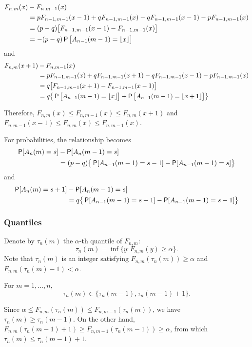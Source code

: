 \documentclass[11pt,draft]{article}
\begin{document}
\begin{align*}
 F_{n,m}(x) &- F_{n,m-1}(x) \\
&= p F_{n-1,m-1}(x-1) + q F_{n-1,m-1}(x) - q F_{n-1,m-1}(x-1)
 - p F_{n-1,m-1}(x) \\
&= (p-q) \big[ F_{n-1,m-1}(x-1) - F_{n-1,m-1}(x) \big] \\
&= -(p-q) \P\big[A_{n-1}(m-1) = \lfloor x \rfloor\big]
\end{align*}
and
\begin{align*}
 F_{n,m}(x+1) &- F_{n,m-1}(x) \\
&= p F_{n-1,m-1}(x) + q F_{n-1,m-1}(x+1) - q F_{n-1,m-1}(x-1)
 - p F_{n-1,m-1}(x) \\
&= q\big[ F_{n-1,m-1}(x+1) - F_{n-1,m-1}(x-1) \big] \\
&= q \big\{ \P\big[A_{n-1}(m-1) = \lfloor x \rfloor\big] +
\P\big[A_{n-1}(m-1) = \lfloor x+1 \rfloor\big] \big\}
\end{align*}

Therefore, $F_{n,m}(x) \leq F_{n,m-1}(x) \leq F_{n,m}(x+1)$ and $F_{n,m-1}(x-1) \leq F_{n,m}(x) \leq F_{n,m-1}(x)$.

For probabilities, the relationship becomes
\begin{align*}
\P[A_n(m) = s] &- \P[A_n(m-1) = s] \\
 &= (p-q) \big\{ \P[A_{n-1}(m-1) = s-1] - \P[A_{n-1}(m-1) = s] \big\}
\end{align*}
and
\begin{align*}
\P[A_n(m) = s+1] &- \P[A_n(m-1) = s] \\
 &= q \big\{ \P[A_{n-1}(m-1) = s+1] - \P[A_{n-1}(m-1) = s-1] \big\}
\end{align*}

\subsubsection{Quantiles}

Denote by $\tau_n(m)$ the $\alpha$-th quantile of $F_{n,m}$:
\[ \tau_n(m) = \inf\{y : F_{n,m}(y) \geq \alpha \}. \]
Note that $\tau_n(m)$ is an integer satisfying $F_{n,m}(\tau_n(m)) \geq \alpha$ and $F_{n,m}(\tau_n(m) - 1) < \alpha$.

\begin{claim}
For $m = 1,\dots,n$,
\[ \tau_n(m) \in \{ \tau_n(m-1), \tau_n(m-1) + 1 \}. \]
\end{claim}
\begin{pf}
Since $\alpha \leq F_{n,m}(\tau_n(m)) \leq F_{n,m-1}(\tau_n(m))$, we have $\tau_n(m) \geq \tau_n(m-1)$.
On the other hand, $F_{n,m}(\tau_n(m-1)+1) \geq F_{n,m-1}(\tau_n(m-1)) \geq \alpha$, from which $\tau_n(m) \leq \tau_n(m-1) + 1$.
\end{pf}
\end{document}

